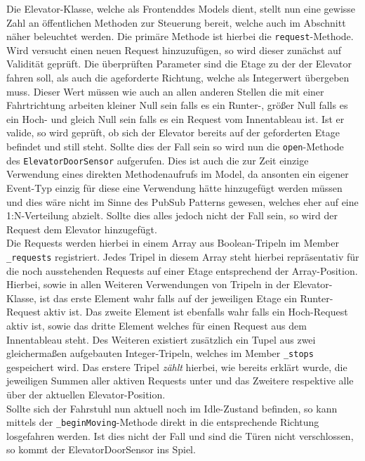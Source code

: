 Die Elevator-Klasse, welche als \glqq Frontend\grqq des Models dient, stellt nun eine gewisse Zahl an öffentlichen Methoden zur Steuerung bereit, welche auch im Abschnitt \textit{} näher beleuchtet werden.
Die primäre Methode ist hierbei die \texttt{request}-Methode.
Wird versucht einen neuen Request hinzuzufügen, so wird dieser zunächst auf Validität geprüft.
Die überprüften Parameter sind die Etage zu der der Elevator fahren soll, als auch die ageforderte Richtung, welche als Integerwert übergeben muss.
Dieser Wert müssen wie auch an allen anderen Stellen die mit einer Fahrtrichtung arbeiten kleiner Null sein falls es ein Runter-, größer Null falls es ein Hoch- und gleich Null sein falls es ein Request vom Innentableau ist.
Ist er valide, so wird geprüft, ob sich der Elevator bereits auf der geforderten Etage befindet und still steht.
Sollte dies der Fall sein so wird nun die \texttt{open}-Methode des \texttt{ElevatorDoorSensor} aufgerufen.
Dies ist auch die zur Zeit einzige Verwendung eines direkten Methodenaufrufs im Model, da ansonten ein eigener Event-Typ einzig für diese eine Verwendung hätte hinzugefügt werden müssen und dies wäre nicht im Sinne des PubSub Patterns gewesen, welches eher auf eine 1:N-Verteilung abzielt.
Sollte dies alles jedoch nicht der Fall sein, so wird der Request dem Elevator hinzugefügt. \\

Die Requests werden hierbei in einem Array aus Boolean-Tripeln im Member \texttt{_requests} registriert.
Jedes Tripel in diesem Array steht hierbei repräsentativ für die noch ausstehenden Requests auf einer Etage entsprechend der Array-Position.
Hierbei, sowie in allen Weiteren Verwendungen von Tripeln in der Elevator-Klasse, ist das erste Element wahr falls auf der jeweiligen Etage ein Runter-Request aktiv ist.
Das zweite Element ist ebenfalls wahr falls ein Hoch-Request aktiv ist, sowie das dritte Element welches für einen Request aus dem Innentableau steht.
Des Weiteren existiert zusätzlich ein Tupel aus zwei gleichermaßen aufgebauten Integer-Tripeln, welches im Member \texttt{_stops} gespeichert wird.
Das erstere Tripel \textit{zählt} hierbei, wie bereits erklärt wurde, die jeweiligen Summen aller aktiven Requests unter und das Zweitere respektive alle über der aktuellen Elevator-Position. \\

Sollte sich der Fahrstuhl nun aktuell noch im Idle-Zustand befinden, so kann mittels der \texttt{_beginMoving}-Methode direkt in die entsprechende Richtung losgefahren werden.
Ist dies nicht der Fall und sind die Türen nicht verschlossen, so kommt der ElevatorDoorSensor ins Spiel. \\

